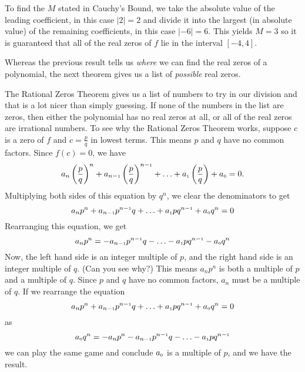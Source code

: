 \medskip

{To find the $M$ stated in Cauchy's Bound, we take the absolute value of the leading coefficient, in this case $|2| = 2$ and divide it into the largest (in absolute value) of the remaining coefficients, in this case $|-6| = 6$.   This yields $M=3$ so it is guaranteed that all of the real zeros of $f$ lie in the interval $[-4,4]$.}

Whereas the previous result tells us \textit{where} we can find the real zeros of a polynomial, the next theorem gives us a list of \textit{possible} real zeros.

\smallskip


\smallskip

The Rational Zeros Theorem gives us a list of numbers to try in our  division and that is a lot nicer than simply guessing.  If none of the numbers in the list are zeros, then either the polynomial has no real zeros at all, or all of the real zeros are irrational numbers.  To see why the Rational Zeros Theorem works, suppose $c$ is a zero of $f$ and $c = \frac{p}{q}$ in lowest terms.  This means $p$ and $q$ have no common factors.  Since $f(c) = 0$, we have 
\[
a_{n} \left(\frac{p}{q}\right)^{n} + a_{n-\mbox{\tiny$1$}}\left(\frac{p}{q}\right)^{n-\mbox{\tiny$1$}} + \ldots + a_{\mbox{\tiny$1$}} \left(\frac{p}{q}\right) + a_{\mbox{\tiny$0$}} = 0.
\]  
Multiplying both sides of this equation by $q^n$, we clear the denominators to get 
\[
a_{n}p^{n} + a_{n-\mbox{\tiny$1$}}p^{n-\mbox{\tiny$1$}}q + \ldots + a_{\mbox{\tiny$1$}}p q^{n-\mbox{\tiny$1$}} + a_{\mbox{\tiny$0$}}q^n = 0
\]  
Rearranging this equation, we get  
\[
a_{n}p^{n} = -a_{n-\mbox{\tiny$1$}}p^{n-\mbox{\tiny$1$}}q - \ldots - a_{\mbox{\tiny$1$}}p q^{n-\mbox{\tiny$1$}} -a_{\mbox{\tiny$0$}}q^n
\] 
Now, the left hand side is an integer multiple of $p$, and the right hand side is an integer multiple of $q$. (Can you see why?)  This means $a_{n}p^{n}$ is both a multiple of $p$ and a multiple of $q$.  Since $p$ and $q$ have no common factors, $a_{n}$ must be a multiple of $q$.  If we rearrange the equation 
\[
a_{n}p^{n} + a_{n-\mbox{\tiny$1$}}p^{n-\mbox{\tiny$1$}}q + \ldots + a_{\mbox{\tiny$1$}}p q^{n-\mbox{\tiny$1$}} + a_{\mbox{\tiny$0$}}q^n = 0
\] 
as 
\[
a_{\mbox{\tiny$0$}}q^n = -a_{n}p^{n} - a_{n-\mbox{\tiny$1$}}p^{n-\mbox{\tiny$1$}}q - \ldots - a_{\mbox{\tiny$1$}}p q^{n-\mbox{\tiny$1$}}
\] 
we can play the same game and conclude $a_{\mbox{\tiny$0$}}$ is a multiple of $p$, and we have the result.

